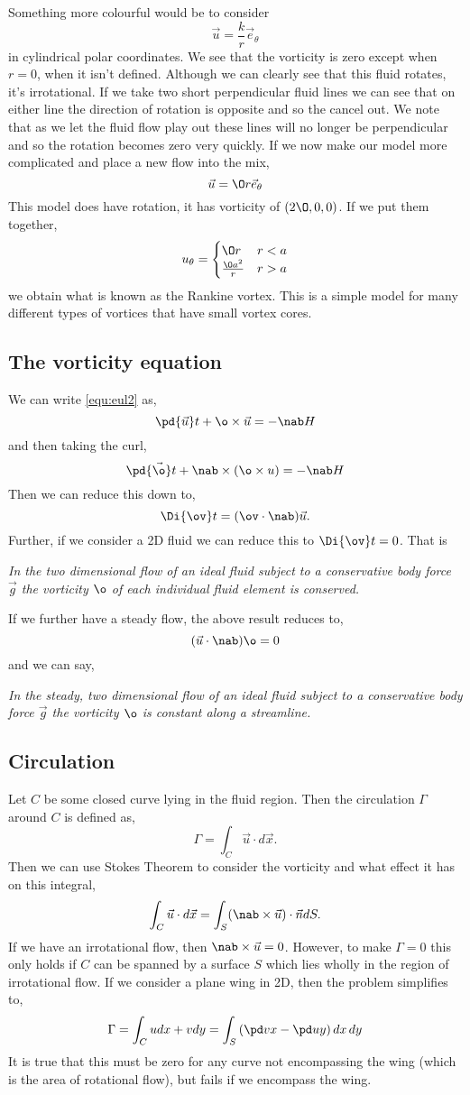 \noindent
Something more colourful would be to consider
$$ \vec u = \frac{k}{r} \vec e_\theta $$
in cylindrical polar coordinates. We see that the vorticity is zero except when $r = 0$, when it isn't defined. Although we can clearly see that this fluid rotates, it's irrotational. If we take two short perpendicular fluid lines we can see that on either line the direction of rotation is opposite and so the cancel out. We note that as we let the fluid flow play out these lines will no longer be perpendicular and so the rotation becomes zero very quickly. If we now make our model more complicated and place a new flow into the mix,
$$ \vec u = \O r\vec e_\theta $$
This model does have rotation, it has vorticity of $(2\O, 0, 0)$. If we put them together,
$$ u_\theta = \begin{cases}
  \O r & r < a \\
  \frac{\O a^2}{r} & r > a
\end{cases} $$
we obtain what is known as the Rankine vortex. This is a simple model for many different types of vortices that have small vortex cores.

\subsection{The vorticity equation}
 We can write \ref{equ:eul2} as,
 $$ \pd {\vec u} t + \o \times \vec u = - \nab H $$
 and then taking the curl,
 $$ \pd {\vec \o} t + \nab \times (\o \times u) = - \nab H $$
 Then we can reduce this down to,
 $$ \Di {\ov} t = (\ov \cdot \nab)\vec u. $$
Further, if we consider a 2D fluid we can reduce this to $\Di {\ov} t = 0$. That is
\begin{center}
  \textit{In the two dimensional flow of an ideal fluid subject to a conservative body force $\vec g$ the vorticity $\o$ of each individual fluid element is conserved.}
\end{center}
If we further have a steady flow, the above result reduces to,
$$ (\vec u \cdot \nab) \o = 0 $$
and we can say,
\begin{center}
  \textit{In the steady, two dimensional flow of an ideal fluid subject to a conservative body force $\vec g$ the vorticity $\o$ is constant along a streamline.}
\end{center}

\subsection{Circulation}
Let $C$ be some closed curve lying in the fluid region. Then the circulation $\Gamma$ around $C$ is defined as,
$$ \Gamma = \int_C \vec u \cdot d\vec x. $$
Then we can use Stokes Theorem to consider the vorticity and what effect it has on this integral,
$$ \int_C \vec u \cdot d \vec x = \int_S (\nab \times \vec u)\cdot \vec n dS. $$
If we have an irrotational flow, then $\nab \times \vec u = 0$. However, to make $\Gamma = 0$ this only holds if $C$ can be spanned by a surface $S$ which lies wholly in the region of irrotational flow. If we consider a plane wing in 2D, then the problem simplifies to,
$$ \Gamma = \int_C udx + vdy = \int_S \left( \pd v x - \pd u y \right)dx\,dy $$
It is true that this must be zero for any curve not encompassing the wing (which is the area of rotational flow), but fails if we encompass the wing.  